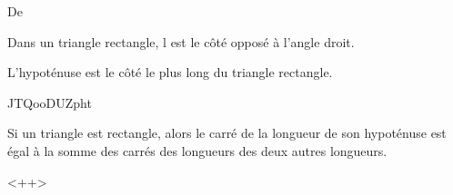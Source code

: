 

De \cite{NRHooXFvgpp4}

\begin{definition}
    Dans un triangle rectangle, l est le côté opposé à l'angle droit.
\end{definition}
\begin{remark}
    L'hypoténuse est le côté le plus long du triangle rectangle.
\end{remark}

JTQooDUZpht

\begin{theorem}[de Pythagore]
    Si un triangle est rectangle, alors le carré de la longueur de son hypoténuse est égal à la somme des carrés des longueurs des deux autres longueurs.
\end{theorem}
<++>

